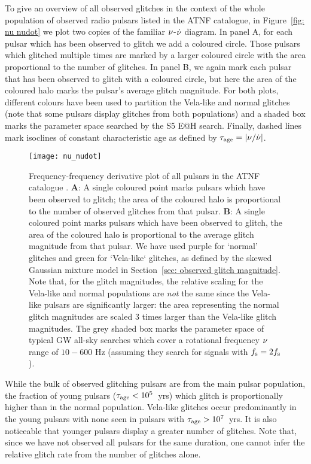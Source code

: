 \documentclass[../full_thesis/full_thesis.tex]{subfiles}
\begin{document}
To give an overview of all observed glitches in the context of the whole population of
observed radio pulsars listed in the ATNF catalogue, in Figure~\ref{fig: nu
nudot} we plot two copies of the familiar $\nu$-$\dot{\nu}$ diagram. In panel A, for each
pulsar which has been observed to glitch we add a coloured circle. Those
pulsars which glitched multiple times are marked by a larger coloured circle
with the area proportional to the number of glitches. In panel B, we again mark
each pulsar that has been observed to glitch with a coloured circle, but here
the area of the coloured halo marks the pulsar's average glitch magnitude.
For both plots, different
colours have been used to partition the Vela-like and normal glitches (note that some
pulsars display glitches from both populations) and a shaded box marks the
parameter space searched by the S5 E@H search. Finally, dashed lines mark isoclines
of constant characteristic age as defined by $\tau_{\mathrm{age}} = \left|\nu/\dot{\nu}\right|$.
\begin{figure}[htb]
\centering
\texttt{[image: nu\_nudot]}
\caption{Frequency-frequency derivative plot of all pulsars in the ATNF
catalogue \citep{ATNF}. \textbf{A}: A single coloured point marks pulsars which have been
observed to glitch; the area of the coloured halo is proportional to the
number of observed glitches from that pulsar. \textbf{B}: A single coloured
point marks pulsars which have been observed to glitch, the area of the coloured
halo is proportional to the average glitch magnitude from that pulsar. We have used
purple for `normal' glitches and green for `Vela-like` glitches, as defined by
the skewed Gaussian mixture model in Section~\ref{sec: observed glitch magnitude}. Note
that, for the glitch magnitudes, the relative scaling for the Vela-like and
normal populations are \emph{not}
the same since the Vela-like pulsars are significantly larger: the area representing
the normal glitch magnitudes are scaled 3 times larger than the Vela-like glitch
magnitudes.
The grey shaded box marks the parameter space of typical GW all-sky searches which
cover a rotational frequency $\nu$ range of $10-600$ Hz (assuming they search for signals
with $f_{\textrm{s}}=2f_{\textrm{s}}$).}
\label{fig: nu nudot}
\end{figure}

While the bulk of observed glitching pulsars are from the main pulsar population, the
fraction of young pulsars ($\tau_{\mathrm{age}} < 10^{5}$~yrs) which glitch is proportionally
higher than in the normal population. Vela-like glitches occur predominantly
in the young pulsars with none seen in pulsars with $\tau_{\mathrm{age}} > 10^{7}$~yrs. It
is also noticeable that younger pulsars display a greater number of glitches. Note
that, since we have not observed all pulsars
for the same duration, one cannot infer the relative glitch rate from the
number of glitches alone.
\end{document}
